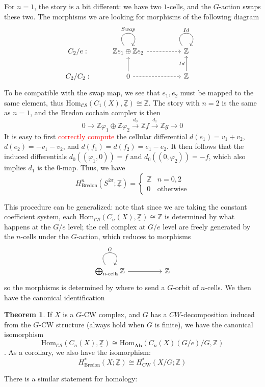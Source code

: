 \documentclass{article}
\theoremstyle{definition}
\newtheorem{theorem}{Theorem}[section] %
\begin{document}
For $n=1$, the story is a bit different: we have two $1$-cells, and the $G$-action swaps these two. The morphisms 
we are looking for morphisms of the following diagram 
\[\begin{tikzcd}
	{C_2/e:} & {\mathbb{Z}e_1\oplus\mathbb{Z}e_2} && {\mathbb{Z}} \\
	{C_2/C_2:} & 0 && {\mathbb{Z}}
	\arrow["Swap", from=1-2, to=1-2, loop, in=55, out=125, distance=10mm]
	\arrow[dashed, from=1-2, to=1-4]
	\arrow["Id", from=1-4, to=1-4, loop, in=55, out=125, distance=10mm]
	\arrow[from=2-2, to=1-2]
	\arrow[dashed, from=2-2, to=2-4]
	\arrow["Id", from=2-4, to=1-4]
\end{tikzcd}\]
To be compatible with the swap map, we see that $e_1,e_2$ must be mapped to the same element, thus $\textrm{Hom}_{\mathcal{CS}}(C_1(X),\underline{\mathbb{Z}})\cong \mathbb{Z}$. The story with $n=2$ is the same as $n=1$, and the Bredon cochain complex is then 
\[0\to \mathbb{Z}\varphi_1\oplus \mathbb{Z}\varphi_2\xrightarrow{d_0} \mathbb{Z}f\xrightarrow{d_1} \mathbb{Z}g\to 0\] 
It is easy to first \textcolor{red}{correctly compute} the cellular differential $d(e_1)=v_1+v_2$, $d(e_2)=-v_1-v_2$, and $d(f_1)=d(f_2)=e_1-e_2$. It then follows that the induced differentials $d_0((\varphi_1,0))=f$ and $d_0((0,\varphi_2))=-f$, which also implies $d_1$ is the $0$-map. Thus, we have 
\[H^n_{\textrm{Bredon}}(S^{2\sigma}; \underline{\mathbb{Z}})=
\begin{cases}
    \mathbb{Z}& n=0,2\\
    0 & \textrm{otherwise}
\end{cases}
\] 

This procedure can be generalized: note that since we are taking the constant coefficient system, each $\textrm{Hom}_{\mathcal{CS}}(C_n(X),\underline{\mathbb{Z}})\cong \mathbb{Z}$ is determined by what happens at the $G/e$ level; the cell complex at $G/e$ level are freely generated by the $n$-cells under the $G$-action, which reduces to morphisms 
\[\begin{tikzcd}
	{\bigoplus_{\textrm{n-cells}}\mathbb{Z}} && {\mathbb{Z}}
	\arrow["G", from=1-1, to=1-1, loop, in=55, out=125, distance=10mm]
	\arrow[from=1-1, to=1-3]
\end{tikzcd}\]
so the morphisms is determined by where to send a $G$-orbit of $n$-cells. We then have the canonical identification 
 
 \begin{tcolorbox}[colback=red!5!white,colframe=red!30!white]
 \begin{theorem}
 If $X$ is a $G$-CW complex, and $G$ has a $CW$-decomposition induced from the $G$-CW structure (always hold when $G$ is finite), we have the canonical isomorphism 
\[\textrm{Hom}_{\mathcal{CS}}(C_n(X),\underline{\mathbb{Z}})\cong \textrm{Hom}_{\textbf{Ab}}(C_n(X)(G/e)/G,\mathbb{Z})\]. As a corollary, we also have the isomorphism:
 \[H^*_{\textrm{Bredon}}(X;\underline{\mathbb{Z}})\cong H^*_{\textrm{CW}}(X/G;\mathbb{Z})\]
 \end{theorem}
 \end{tcolorbox}
There is a similar statement for homology:
\end{document}

